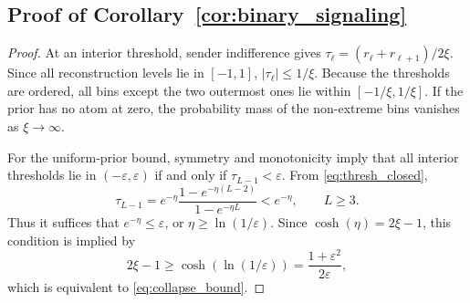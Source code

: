 \documentclass[journal,twoside,web]{ieeecolor}
\begin{document}
\subsection{Proof of Corollary~\ref{cor:binary_signaling}}
\label{app:proof_binary_signaling}

\begin{proof}
    At an interior threshold, sender indifference gives $\tau_\ell=({r_\ell+r_{\ell+1}})/{2\xi}$.
    Since all reconstruction levels lie in $[-1,1]$, $|\tau_\ell|\le1/\xi$. Because the thresholds are ordered, all bins except the two outermost ones lie within $[-1/\xi,1/\xi]$.
    If the prior has no atom at zero, the probability mass of the non-extreme bins vanishes as $\xi\to\infty$.

    For the uniform-prior bound, symmetry and monotonicity imply that all interior thresholds lie in $(-\varepsilon,\varepsilon)$ if and only if $\tau_{L-1}<\varepsilon$. From \eqref{eq:thresh_closed},
    \[
        \tau_{L-1}
        =
        e^{-\eta}
        \frac{1-e^{-\eta(L-2)}}{1-e^{-\eta L}}
        <
        e^{-\eta},
        \qquad L\ge3.
    \]
    Thus it suffices that $e^{-\eta}\le\varepsilon$, or $\eta\ge\ln(1/\varepsilon)$. Since $\cosh(\eta)=2\xi-1$, this condition is implied by
    \[
        2\xi-1
        \ge
        \cosh(\ln(1/\varepsilon))
        =
        \frac{1+\varepsilon^2}{2\varepsilon},
    \]
    which is equivalent to \eqref{eq:collapse_bound}.
\end{proof}




\end{document}
